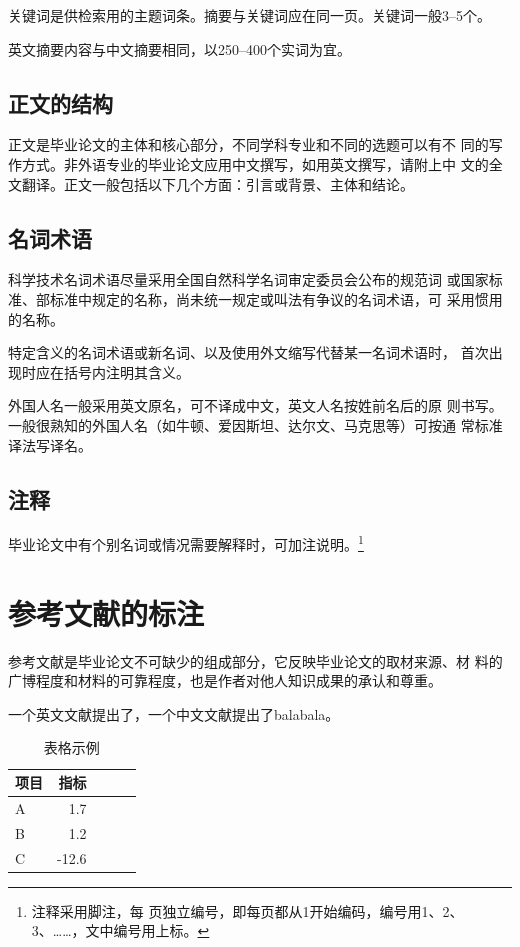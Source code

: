\documentclass{swufethesis}
\begin{document}
关键词是供检索用的主题词条。摘要与关键词应在同一页。关键词一般3--5个。

英文摘要内容与中文摘要相同，以250--400个实词为宜。

\section{正文的结构}
正文是毕业论文的主体和核心部分，不同学科专业和不同的选题可以有不
同的写作方式。非外语专业的毕业论文应用中文撰写，如用英文撰写，请附上中
文的全文翻译。正文一般包括以下几个方面：引言或背景、主体和结论。

\section{名词术语}
科学技术名词术语尽量采用全国自然科学名词审定委员会公布的规范词
或国家标准、部标准中规定的名称，尚未统一规定或叫法有争议的名词术语，可
采用惯用的名称。

特定含义的名词术语或新名词、以及使用外文缩写代替某一名词术语时，
首次出现时应在括号内注明其含义。

外国人名一般采用英文原名，可不译成中文，英文人名按姓前名后的原
则书写。一般很熟知的外国人名（如牛顿、爱因斯坦、达尔文、马克思等）可按通
常标准译法写译名。

\section{注释}
毕业论文中有个别名词或情况需要解释时，可加注说明。\footnote{注释采用脚注，每
  页独立编号，即每页都从1开始编码，编号用1、2、3、……，文中编号用上标。}

\chapter{参考文献的标注}
参考文献是毕业论文不可缺少的组成部分，它反映毕业论文的取材来源、材
料的广博程度和材料的可靠程度，也是作者对他人知识成果的承认和尊重。

一个英文文献\cite{dirac}提出了，一个中文文献\cite{蔡敏2006--}提出了balabala。

\begin{table}[htb]
  \caption{表格示例}
  \centering
  \begin{tabular}{lrrrr}
    \toprule
    项目 & 指标  \\
    \midrule
    A    & 1.7   \\
    B    & 1.2   \\
    C    & -12.6 \\
    \bottomrule
  \end{tabular}
\end{table}
\end{document}

